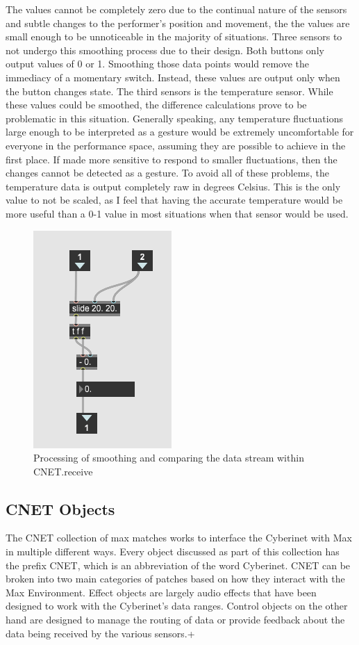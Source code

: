 The values cannot be completely zero due to the continual nature of the sensors and subtle changes to the performer's position and movement, the the values are small enough to be unnoticeable in the majority of situations. Three sensors to not undergo this smoothing process due to their design. Both buttons only output values of 0 or 1. Smoothing those data points would remove the immediacy of a momentary switch. Instead, these values are output only when the button changes state. The third sensors is the temperature sensor. While these values could be smoothed, the difference calculations prove to be problematic in this situation. Generally speaking, any temperature fluctuations large enough to be interpreted as a gesture would be extremely uncomfortable for everyone in the performance space, assuming they are possible to achieve in the first place. If made more sensitive to respond to smaller fluctuations, then the changes cannot be detected as a gesture. To avoid all of these problems, the temperature data is output completely raw in degrees Celsius. This is the only value to not be scaled, as I feel that having the accurate temperature would be more useful than a 0-1 value in most situations when that sensor would be used.


\begin{figure}
    \centering
    \includegraphics[scale=1.3]{diagrams/maxPatches/smoothr.png}
    \caption{Processing of smoothing and comparing the data stream within CNET.receive}
    \label{fig:smoothr}
\end{figure}

\subsection{CNET Objects}
The CNET collection of max matches works to interface the Cyberinet with Max in multiple different ways. Every object discussed as part of this collection has the prefix CNET, which is an abbreviation of the word Cyberinet. CNET can be broken into two main categories of patches based on how they interact with the Max Environment. Effect objects are largely audio effects that have been designed to work with the Cyberinet's data ranges. Control objects on the other hand are designed to manage the routing of data or provide feedback about the data being received by the various sensors.+

